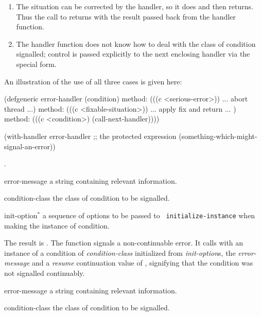 \begin{optDefinition}
\begin{enumerate}
    \item The situation can be corrected by the handler, so it does and then
    returns. Thus the call to  returns with the result
    passed back from the handler function.

    \item The handler function does not know how to deal with the class of
    condition signalled; control is passed explicitly to the next enclosing
    handler via the  special form.
\end{enumerate}
%
An illustration of the use of all three cases is given here:
%
\begin{example}
\label{example:with-handler}
{\codeExample
(defgeneric error-handler (condition)
   method: (((c <serious-error>))
            ... abort thread ...)
   method: (((c <fixable-situation>))
            ... apply fix and return ... )
   method: (((c <condition>) (call-next-handler))))

(with-handler error-handler
      ;; the protected expression
      (something-which-might-signal-an-error))
\endCodeExample}
\end{example}
%
\seealso%
.

%
\begin{arguments}
    \item[error-message] a string containing relevant information.

    \item[condition-class] the class of condition to be signalled.

    \item[init-option\/$^*$] a sequence of options to be passed to {\tt
        initialize-instance} when making the instance of condition.
\end{arguments}
%
\result%
The result is \nil{}.
%
\remarks%
The  function signals a non-continuable error.  It calls
 with an instance of a condition of {\em condition-class}
initialized from {\em init-option}\/s, the {\em error-message} and a {\em
    resume} continuation value of \nil{}, signifying that the condition was not
signalled continuably.

%
\begin{arguments}
    \item[error-message] a string containing relevant information.

    \item[condition-class] the class of condition to be signalled.


\end{arguments}
\end{optDefinition}
